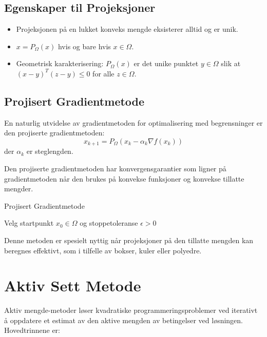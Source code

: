 \subsection{Egenskaper til Projeksjoner}
\begin{itemize}
	\item Projeksjonen på en lukket konveks mengde eksisterer alltid og er unik.
	\item \( x = P_\Omega(x) \) hvis og bare hvis \( x \in \Omega \).
	\item Geometrisk karakterisering: \( P_\Omega(x) \) er det unike punktet \( y \in \Omega \) slik at \( (x - y)^T(z - y) \leq 0 \) for alle \( z \in \Omega \).
\end{itemize}

\subsection{Projisert Gradientmetode}
En naturlig utvidelse av gradientmetoden for optimalisering med begrensninger er den projiserte gradientmetoden:
\[
	x_{k+1} = P_\Omega(x_k - \alpha_k \nabla f(x_k))
\]
der \( \alpha_k \) er steglengden.

Den projiserte gradientmetoden har konvergensgarantier som ligner på gradientmetoden når den brukes på konvekse funksjoner og konvekse tillatte mengder.

\begin{algorithm}[H]
	\caption{Projisert Gradientmetode}
	Velg startpunkt \( x_0 \in \Omega \) og stoppetoleranse \( \epsilon > 0 \)\;
\end{algorithm}

Denne metoden er spesielt nyttig når projeksjoner på den tillatte mengden kan beregnes effektivt, som i tilfelle av bokser, kuler eller polyedre.

\section{Aktiv Sett Metode}
Aktiv mengde-metoder løser kvadratiske programmeringsproblemer ved iterativt å oppdatere et estimat av den aktive mengden av betingelser ved løsningen. Hovedtrinnene er:

